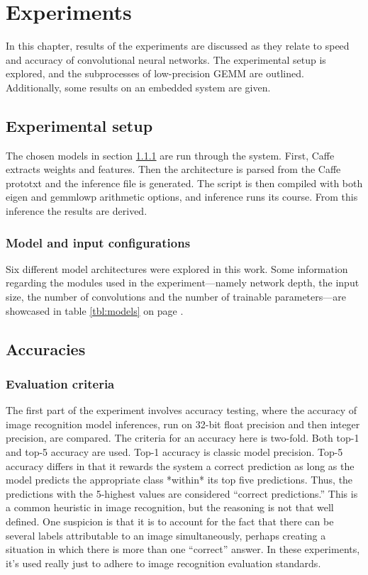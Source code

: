 \chapter{Experiments}
In this chapter, results of the experiments are discussed as they relate to speed and accuracy of convolutional neural networks. The experimental setup is explored, and the subprocesses of low-precision GEMM are outlined. Additionally, some results on an embedded system are given.

\section{Experimental setup}
The chosen models in section \ref{sec:input} are run through the system. First, Caffe extracts weights and features. Then the architecture is parsed from the Caffe prototxt and the inference file is generated. The script is then compiled with both eigen and gemmlowp arithmetic options, and inference runs its course. From this inference the results are derived.

\subsection{Model and input configurations}
\label{sec:input}
Six different model architectures were explored in this work. Some information regarding the modules used in the experiment---namely network depth, the input size, the number of convolutions and the number of trainable parameters---are showcased in table \ref{tbl:models} on page \pageref{tbl:models}.

\section{Accuracies}
\subsection{Evaluation criteria}
The first part of the experiment involves accuracy testing, where the accuracy of image recognition model inferences, run on 32-bit float precision and then integer precision, are compared. The criteria for an accuracy here is two-fold. Both top-1 and top-5 accuracy are used. Top-1 accuracy is classic model precision. Top-5 accuracy differs in that it rewards the system a correct prediction as long as the model predicts the appropriate class *within* its top five predictions. Thus, the predictions with the 5-highest values are considered ``correct predictions.'' This is a common heuristic in image recognition, but the reasoning is not that well defined. One suspicion is that it is to account for the fact that there can be several labels attributable to an image simultaneously, perhaps creating a situation in which there is more than one ``correct'' answer. In these experiments, it's used really just to adhere to image recognition evaluation standards.

